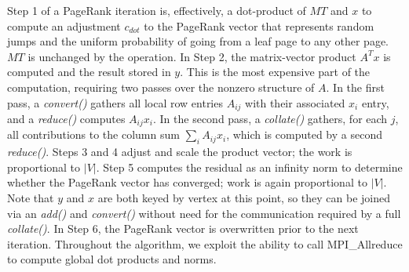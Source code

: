 Step 1 of a PageRank iteration is, effectively, a dot-product of $MT$ and
$x$ to compute an adjustment $c_{dot}$ to the PageRank vector that
represents random jumps and the uniform probability of going from a 
leaf page to any
other page.  $MT$ is unchanged by the operation.  
In Step 2, the
matrix-vector product $A^T x$ is computed and the result stored in
$y$.  This is the most expensive part of the computation, requiring
two passes over the nonzero structure of $A$.  In the first pass, a
{\it convert()} gathers all local row entries $A_{ij}$ with their
associated $x_i$ entry, and a {\it reduce()} computes $A_{ij} x_i$.
In the second pass, a {\it collate()} gathers, for each $j$, all
contributions to the column sum $\sum_i A_{ij} x_i$, which is computed
by a second {\it reduce()}.  Steps 3 and 4 adjust and scale the
product vector; the work is proportional to $|V|$.  Step 5 computes
the residual as an infinity norm to determine whether the PageRank
vector has converged; work is again proportional to $|V|$.  Note that
$y$ and $x$ are both keyed by vertex at this point, so they can be
joined via an {\it add()} and {\it convert()} without need for the
communication required by a full {\it collate()}.  In Step 6, the
PageRank vector is overwritten prior to the next iteration.
Throughout the algorithm, we exploit the ability to call
MPI\_Allreduce to compute global dot products and norms.

